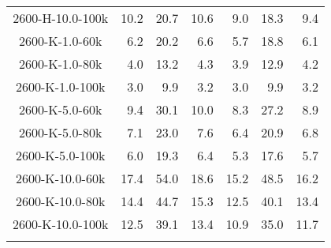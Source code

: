 \begin{longtable}{crrrrrr}
      2600-H-10.0-100k &        10.2 &        20.7 &        10.6 &            9.0 &           18.3 &            9.4 \\
      2600-K-1.0-60k &         6.2 &        20.2 &         6.6 &            5.7 &           18.8 &            6.1 \\
      2600-K-1.0-80k &         4.0 &        13.2 &         4.3 &            3.9 &           12.9 &            4.2 \\
      2600-K-1.0-100k &         3.0 &         9.9 &         3.2 &            3.0 &            9.9 &            3.2 \\
      2600-K-5.0-60k &         9.4 &        30.1 &        10.0 &            8.3 &           27.2 &            8.9 \\
      2600-K-5.0-80k &         7.1 &        23.0 &         7.6 &            6.4 &           20.9 &            6.8 \\
      2600-K-5.0-100k &         6.0 &        19.3 &         6.4 &            5.3 &           17.6 &            5.7 \\
      2600-K-10.0-60k &        17.4 &        54.0 &        18.6 &           15.2 &           48.5 &           16.2 \\
      2600-K-10.0-80k &        14.4 &        44.7 &        15.3 &           12.5 &           40.1 &           13.4 \\
      2600-K-10.0-100k &        12.5 &        39.1 &        13.4 &           10.9 &           35.0 &           11.7 \\
    \label{tab:rv_aces_btsettl}
\end{longtable}


\clearpage{}

